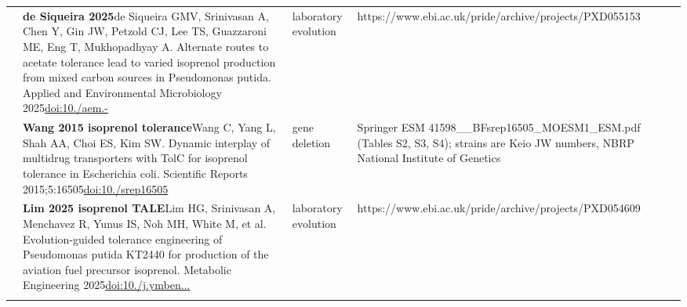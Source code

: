 \begin{landscape}
\begin{longtable}{@{}r@{\hspace{4pt}} L{86mm} L{74mm} L{78mm}@{}}
 & \textbf{de Siqueira 2025}\newline de Siqueira GMV, Srinivasan A, Chen Y, Gin JW, Petzold CJ, Lee TS, Guazzaroni ME, Eng T, Mukhopadhyay A. Alternate routes to acetate tolerance lead to varied isoprenol production from mixed carbon sources in Pseudomonas putida. Applied and Environmental Microbiology 2025\newline \href{https://doi.org/10.1128/aem.02123-24}{doi:10./\allowbreak aem.-} & laboratory evolution & https:/\allowbreak /\allowbreak www.\allowbreak ebi.\allowbreak ac.\allowbreak uk/\allowbreak pride/\allowbreak archive/\allowbreak projects/\allowbreak PXD055153 \\
 & \textbf{Wang 2015 isoprenol tolerance}\newline Wang C, Yang L, Shah AA, Choi ES, Kim SW. Dynamic interplay of multidrug transporters with TolC for isoprenol tolerance in Escherichia coli. Scientific Reports 2015;5:16505\newline \href{https://doi.org/10.1038/srep16505}{doi:10./\allowbreak srep16505} & gene deletion & Springer ESM 41598\_\_\allowbreak BFsrep16505\_\allowbreak MOESM1\_\allowbreak ESM.\allowbreak pdf (Tables S2, S3, S4); strains are Keio JW numbers, NBRP National Institute of Genetics \\
 & \textbf{Lim 2025 isoprenol TALE}\newline Lim HG, Srinivasan A, Menchavez R, Yunus IS, Noh MH, White M, et al. Evolution-guided tolerance engineering of Pseudomonas putida KT2440 for production of the aviation fuel precursor isoprenol. Metabolic Engineering 2025\newline \href{https://doi.org/10.1016/j.ymben.2025.05.007}{doi:10./\allowbreak j.\allowbreak ymben...} & laboratory evolution & https:/\allowbreak /\allowbreak www.\allowbreak ebi.\allowbreak ac.\allowbreak uk/\allowbreak pride/\allowbreak archive/\allowbreak projects/\allowbreak PXD054609 \\
\addlinespace[5pt]

\end{longtable}
\end{landscape}
